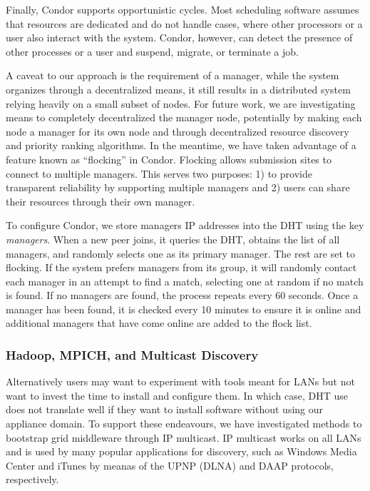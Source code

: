 \documentclass[conference]{IEEEtran}
\begin{document}
Finally, Condor supports opportunistic cycles.  Most scheduling software
assumes that resources are dedicated and do not handle cases, where other
processors or a user also interact with the system.  Condor, however, can
detect the presence of other processes or a user and suspend, migrate, or
terminate a job.

A caveat to our approach is the requirement of a manager, while the system
organizes through a decentralized means, it still results in a distributed
system relying heavily on a small subset of nodes.  For future work, we are
investigating means to completely decentralized the manager node, potentially
by making each node a manager for its own node and through decentralized
resource discovery and priority ranking algorithms.  In the meantime, we have
taken advantage of a feature known as ``flocking'' in Condor.  Flocking allows
submission sites to connect to multiple managers.  This serves two purposes: 1)
to provide transparent reliability by supporting multiple managers and 2) users
can share their resources through their own manager.  

To configure Condor, we store managers IP addresses into the DHT using the key
\emph{managers}.  When a new peer joins, it queries the DHT, obtains the list
of all managers, and randomly selects one as its primary manager.  The rest are
set to flocking.  If the system prefers managers from its group, it will
randomly contact each manager in an attempt to find a match, selecting one at
random if no match is found.  If no managers are found, the process repeats
every 60 seconds.  Once a manager has been found, it is checked every 10
minutes to ensure it is online and additional managers that have come online
are added to the flock list.

\subsubsection{Hadoop, MPICH, and Multicast Discovery}

Alternatively users may want to experiment with tools meant for LANs but not
want to invest the time to install and configure them.  In which case, DHT use
does not translate well if they want to install software without using our
appliance domain.  To support these endeavours, we have investigated methods to
bootstrap grid middleware through IP multicast.  IP multicast works on all LANs
and is used by many popular applications for discovery, such as Windows Media
Center and iTunes by meanas of the UPNP (DLNA) and DAAP protocols,
respectively.
\end{document}
